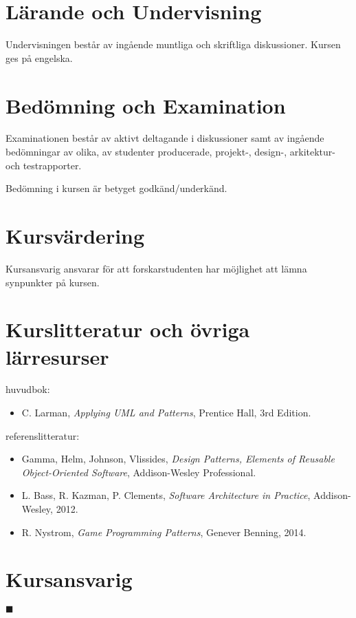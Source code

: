 \documentclass[10pt]{article}
\begin{document}
\begin{multicols}{2}
\section{Lärande och Undervisning}
Undervisningen består av ingående muntliga och skriftliga diskussioner. Kursen ges på engelska.

\section{Bedömning och Examination}
Examinationen består av aktivt deltagande i diskussioner samt av ingående bedömningar av olika, av studenter producerade, projekt-, design-, arkitektur- och testrapporter.

Bedömning i kursen är betyget godkänd/underkänd.

\section{Kursvärdering}
Kursansvarig ansvarar för att forskarstudenten har möjlighet att lämna synpunkter på kursen.

\section{Kurslitteratur och övriga lärresurser}
huvudbok:

\begin{itemize}
\item C. Larman, \emph{Applying UML and Patterns}, Prentice Hall, 3rd Edition.
\end{itemize}
  
\noindent referenslitteratur:

\begin{itemize}
\item Gamma, Helm, Johnson, Vlissides, \emph{Design Patterns, Elements of Reusable Object-Oriented Software}, Addison-Wesley Professional.
\item L. Bass, R. Kazman, P. Clements, \emph{Software Architecture in Practice}, Addison-Wesley, 2012.
\item R. Nystrom, \emph{Game Programming Patterns}, Genever Benning, 2014.
\end{itemize}

\section{Kursansvarig}
\makeatletter
\@author
\makeatother

\noindent $\blacksquare$
\end{multicols}
\end{document}
